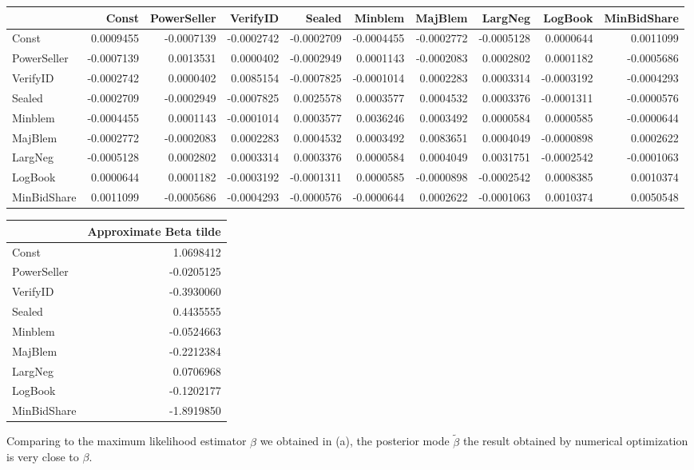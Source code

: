 \documentclass[]{article}
\begin{document}
\begin{longtable}[]{@{}lrrrrrrrrr@{}}
\toprule
& Const & PowerSeller & VerifyID & Sealed & Minblem & MajBlem & LargNeg
& LogBook & MinBidShare\tabularnewline
\midrule
\endhead
Const & 0.0009455 & -0.0007139 & -0.0002742 & -0.0002709 & -0.0004455 &
-0.0002772 & -0.0005128 & 0.0000644 & 0.0011099\tabularnewline
PowerSeller & -0.0007139 & 0.0013531 & 0.0000402 & -0.0002949 &
0.0001143 & -0.0002083 & 0.0002802 & 0.0001182 &
-0.0005686\tabularnewline
VerifyID & -0.0002742 & 0.0000402 & 0.0085154 & -0.0007825 & -0.0001014
& 0.0002283 & 0.0003314 & -0.0003192 & -0.0004293\tabularnewline
Sealed & -0.0002709 & -0.0002949 & -0.0007825 & 0.0025578 & 0.0003577 &
0.0004532 & 0.0003376 & -0.0001311 & -0.0000576\tabularnewline
Minblem & -0.0004455 & 0.0001143 & -0.0001014 & 0.0003577 & 0.0036246 &
0.0003492 & 0.0000584 & 0.0000585 & -0.0000644\tabularnewline
MajBlem & -0.0002772 & -0.0002083 & 0.0002283 & 0.0004532 & 0.0003492 &
0.0083651 & 0.0004049 & -0.0000898 & 0.0002622\tabularnewline
LargNeg & -0.0005128 & 0.0002802 & 0.0003314 & 0.0003376 & 0.0000584 &
0.0004049 & 0.0031751 & -0.0002542 & -0.0001063\tabularnewline
LogBook & 0.0000644 & 0.0001182 & -0.0003192 & -0.0001311 & 0.0000585 &
-0.0000898 & -0.0002542 & 0.0008385 & 0.0010374\tabularnewline
MinBidShare & 0.0011099 & -0.0005686 & -0.0004293 & -0.0000576 &
-0.0000644 & 0.0002622 & -0.0001063 & 0.0010374 &
0.0050548\tabularnewline
\bottomrule
\end{longtable}

\begin{longtable}[]{@{}lr@{}}
\toprule
& Approximate Beta tilde\tabularnewline
\midrule
\endhead
Const & 1.0698412\tabularnewline
PowerSeller & -0.0205125\tabularnewline
VerifyID & -0.3930060\tabularnewline
Sealed & 0.4435555\tabularnewline
Minblem & -0.0524663\tabularnewline
MajBlem & -0.2212384\tabularnewline
LargNeg & 0.0706968\tabularnewline
LogBook & -0.1202177\tabularnewline
MinBidShare & -1.8919850\tabularnewline
\bottomrule
\end{longtable}

Comparing to the maximum likelihood estimator \(\beta\) we obtained in
(a), the posterior mode \(\tilde{\beta}\) the result obtained by
numerical optimization is very close to \(\beta\).
\end{document}
